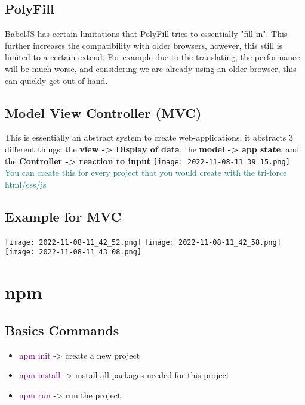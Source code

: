\documentclass[main.tex,fontsize=6pt,paper=a4,paper=landscape,DIV=calc,]{scrartcl}
\begin{document}
\begin{multicols*}{4}
\subsection{PolyFill} 
BabelJS has certain limitations that PolyFill tries to essentially "fill in". This further increases the compatibility with older browsers, however, this still is limited to a certain extend.\newline
For example due to the translating, the performance will be much worse, and considering we are already using an older browser, this can quickly get out of hand.

\subsection{Model View Controller (MVC)}  
This is essentially an abstract system to create web-applications, it abstracts 3 different things: the \textbf{view -> Display of data}, the \textbf{model -> app state}, and the \textbf{Controller -> reaction to input}\newline
\texttt{[image: 2022-11-08-11\_39\_15.png]}\newline
\textcolor{teal}{You can create this for every project that you would create with the tri-force html/css/js}

\subsection{Example for MVC}  
\texttt{[image: 2022-11-08-11\_42\_52.png]}\newline
\texttt{[image: 2022-11-08-11\_42\_58.png]}
\texttt{[image: 2022-11-08-11\_43\_08.png]}


\section{npm}

\subsection{Basics Commands}  
\begin{itemize}
\item \textcolor{purple}{npm init} -> create a new project
\item \textcolor{purple}{npm install} -> install all packages needed for this project
\item \textcolor{purple}{npm run} -> run the project
\end{itemize} 


\end{multicols*}
\end{document}
